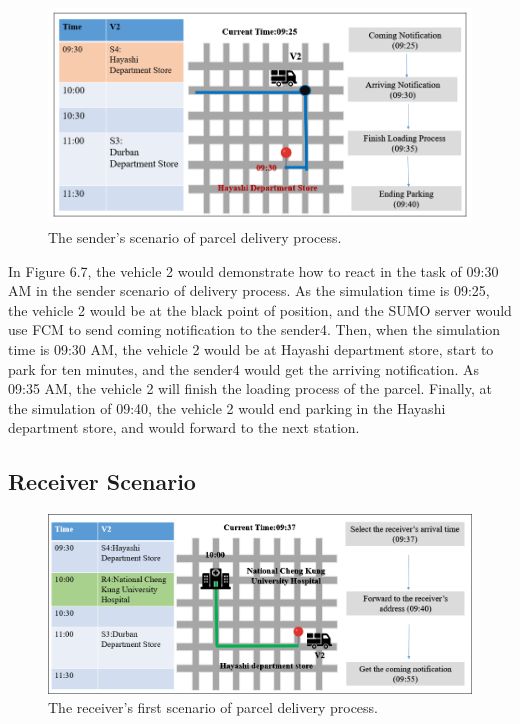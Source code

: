 \documentclass[12pt]{ksthesis}
\begin{document}
\begin{thesis}
{\begin{figure}[H]
\centering
\includegraphics[scale=0.65]{./Thesis_figures/F6-7_senderScenario.PNG}
\caption{\large The sender's scenario of parcel delivery process.}
\vspace{0.5cm}
\label{Fig:senderScenario_DeliveryPorcess}
\end{figure}

In Figure 6.7, the vehicle 2 would demonstrate how to react in the task of 09:30 AM in the sender scenario of delivery process. As the simulation time is 09:25, the vehicle 2 would be at the black point of position, and the SUMO server would use FCM to send coming notification to the sender4. Then, when the simulation time is 09:30 AM, the vehicle 2 would be at Hayashi department store, start to park for ten minutes, and the sender4 would get the arriving notification.
As 09:35 AM, the vehicle 2 will finish the loading process of the parcel. Finally, at the simulation of 09:40, the vehicle 2 would end parking in the Hayashi department store, and would forward to the next station.

\subsection{Receiver Scenario}

\begin{figure}[H]
\centering
\includegraphics[scale=0.57]{./Thesis_figures/F6-8_receiverScenario1.PNG}
\caption{\large The receiver's first scenario of parcel delivery process.}
\vspace{0.5cm}
\label{Fig:FirsrtReceiverScenario_deliveryProcess}
\end{figure}

}
\end{thesis}
\end{document}
